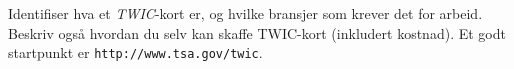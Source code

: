 

Identifiser hva et {\it TWIC}-kort er, og hvilke bransjer som krever det for arbeid. Beskriv også hvordan du selv kan skaffe TWIC-kort (inkludert kostnad). Et godt startpunkt er {\tt http://www.tsa.gov/twic}.

\vskip 50pt
















